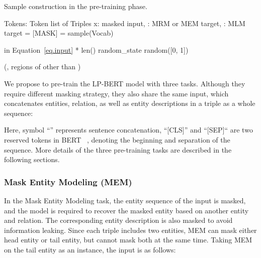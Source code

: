 \documentclass[journal]{IEEEtran}
\begin{document}
\begin{algorithm}
\caption{Sample construction in the pre-training phase.}
		\label{alg.sampleconstruction}
		\begin{algorithmic}[1] 
			\Require Tokens: Token list of Triples 
			\Ensure x: masked input, : MRM or MEM target, : MLM target
			\State 
			\State  = [MASK]
			\Else
			\State  = sample(Vocab)
			\EndIf
			\EndIf
			\EndIf
			\EndFor
			\State \Return{}
			\EndFunction
			\State

			\State  in Equation~\ref{eq.input}
			\State  [PAD] * len()
			\State random\_state random([0, 1])

			\State 
			\State 
			\State 
			\State 
			\EndIf
			
			\State 
			\State 
			\State 
			\State 
			\EndIf
            
			\State 
			\State 
			\State  {}(, regions of  other than )
			\EndIf


			\State \Return{}

		\end{algorithmic}
	\end{algorithm}

We propose to pre-train the LP-BERT model with three tasks. Although they require different masking strategy, they also share the same input, which concatenates entities, relation, as well as entity descriptions in a triple as a whole sequence:
\begin{small}

\end{small}
Here, symbol ``'' represents sentence concatenation, ``[CLS]'' and ``[SEP]`` are two reserved tokens in BERT ~\cite{devlin2018bert}, denoting the beginning and separation of the sequence. More details of the three pre-training tasks are described in the following sections.


\subsubsection{Mask Entity Modeling (MEM)}

In the Mask Entity Modeling task, the entity sequence of the input is masked, and the model is required to recover the masked entity based on another entity and relation. The corresponding entity description is also masked to avoid information leaking. 
Since each triple includes two entities, MEM can mask either head entity or tail entity, but cannot mask both at the same time. Taking MEM on the tail entity as an instance, the input is as follows:
\begin{small}

\end{small}
\end{document}
